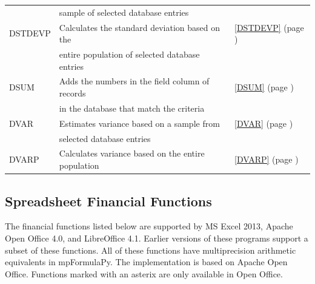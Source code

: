 \begin{center}
\begin{longtable}{l l l }
		& sample of selected database entries &   \\
		DSTDEVP & Calculates the standard deviation based on the  &  \ref{DSTDEVP} (page \pageref{DSTDEVP}) \index{Spreadsheet Functions!DSTDEVP} \\
		& entire population of selected database entries &   \\
		DSUM  & Adds the numbers in the field column of records &  \ref{DSUM} (page \pageref{DSUM}) \index{Spreadsheet Functions!DSUM} \\
		& in the database that match the criteria &   \\
		DVAR  & Estimates variance based on a sample from &  \ref{DVAR} (page \pageref{DVAR}) \index{Spreadsheet Functions!DVAR} \\
		& selected database entries &   \\
		DVARP & Calculates variance based on the entire population  &  \ref{DVARP} (page \pageref{DVARP}) \index{Spreadsheet Functions!DVARP} \\
	\end{longtable}
\end{center}





\newpage 
\subsection{Spreadsheet Financial Functions}
The financial functions listed below are supported by MS Excel 2013, Apache Open Office 4.0, and LibreOffice 4.1. Earlier versions of these programs support a subset of these functions.
All of these functions have multiprecision arithmetic equivalents in mpFormulaPy. The implementation is based on Apache Open Office. Functions marked with an asterix
are only available in Open Office.



